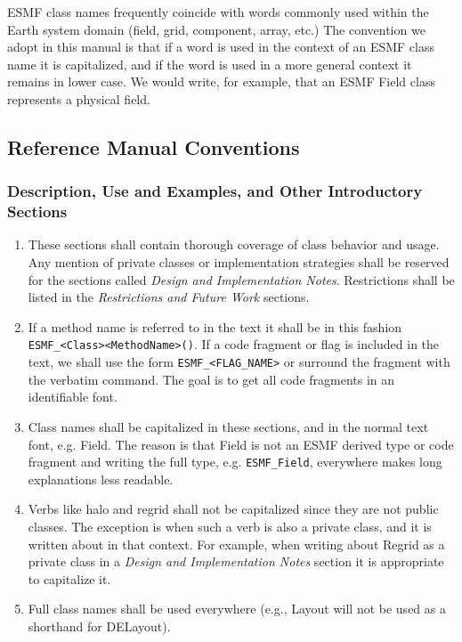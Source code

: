 ESMF class names frequently coincide with words commonly
used within the Earth system domain (field, grid, component, array, 
etc.)  The convention we adopt in this manual is that if a word is 
used in the context of an ESMF class name it is capitalized, and 
if the word is used in a more general context it remains in lower 
case.  We would write, for example, that an ESMF Field class 
represents a physical field.

\subsection{Reference Manual Conventions}

\subsubsection{Description, Use and Examples, and Other Introductory Sections}

\begin{enumerate}
\item These sections shall contain thorough coverage of class
behavior and usage.  Any mention of private classes or implementation 
strategies shall be reserved for the sections called {\it Design and 
Implementation Notes}.  Restrictions shall be listed in the 
{\it Restrictions and Future Work} sections.
  
\item If a method name is referred to in the text it shall be in this
fashion {\tt ESMF\_<Class><MethodName>()}.  If a code fragment or flag is
included in the text, we shall use the form {\tt ESMF\_<FLAG\_NAME>} 
or surround the fragment with the \latex  verbatim command.  The 
goal is to get all code fragments in an identifiable font.

\item Class names shall be capitalized in these sections, and
in the normal text font, e.g. Field.  The reason is that 
Field is not an ESMF derived type or code fragment and writing 
the full type, e.g. {\tt ESMF\_Field}, everywhere makes long 
explanations less readable.

\item Verbs like halo and regrid shall not be capitalized since they 
are not public classes. The exception is when such a verb is also a
private class, and it is written about in that context.  For example, 
when writing about Regrid as a private class in a {\it Design and 
Implementation Notes} section it is appropriate to capitalize it.

\item Full class names shall be used everywhere (e.g., Layout will
not be used as a shorthand for DELayout).

\end{enumerate}

